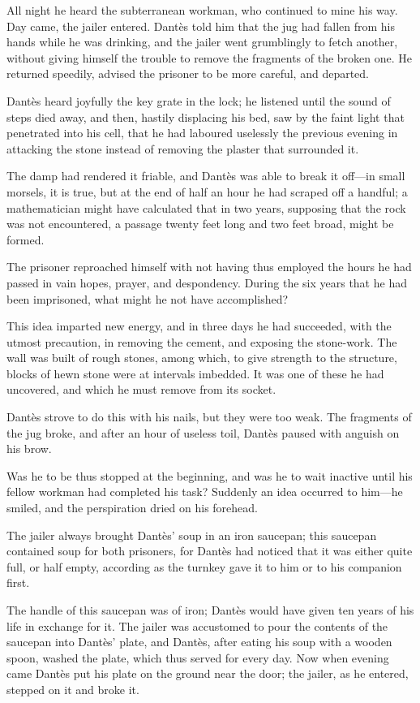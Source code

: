  All night he heard the subterranean workman, who continued to mine his way. Day came, the jailer entered. Dantès told him that the jug had fallen from his hands while he was drinking, and the jailer went grumblingly to fetch another, without giving himself the trouble to remove the fragments of the broken one. He returned speedily, advised the prisoner to be more careful, and departed. 

 Dantès heard joyfully the key grate in the lock; he listened until the sound of steps died away, and then, hastily displacing his bed, saw by the faint light that penetrated into his cell, that he had laboured uselessly the previous evening in attacking the stone instead of removing the plaster that surrounded it. 

 The damp had rendered it friable, and Dantès was able to break it off—in small morsels, it is true, but at the end of half an hour he had scraped off a handful; a mathematician might have calculated that in two years, supposing that the rock was not encountered, a passage twenty feet long and two feet broad, might be formed. 

 The prisoner reproached himself with not having thus employed the hours he had passed in vain hopes, prayer, and despondency. During the six years that he had been imprisoned, what might he not have accomplished? 

 This idea imparted new energy, and in three days he had succeeded, with the utmost precaution, in removing the cement, and exposing the stone-work. The wall was built of rough stones, among which, to give strength to the structure, blocks of hewn stone were at intervals imbedded. It was one of these he had uncovered, and which he must remove from its socket. 

 Dantès strove to do this with his nails, but they were too weak. The fragments of the jug broke, and after an hour of useless toil, Dantès paused with anguish on his brow. 

 Was he to be thus stopped at the beginning, and was he to wait inactive until his fellow workman had completed his task? Suddenly an idea occurred to him—he smiled, and the perspiration dried on his forehead. 

 The jailer always brought Dantès' soup in an iron saucepan; this saucepan contained soup for both prisoners, for Dantès had noticed that it was either quite full, or half empty, according as the turnkey gave it to him or to his companion first. 

 The handle of this saucepan was of iron; Dantès would have given ten years of his life in exchange for it.  The jailer was accustomed to pour the contents of the saucepan into Dantès' plate, and Dantès, after eating his soup with a wooden spoon, washed the plate, which thus served for every day. Now when evening came Dantès put his plate on the ground near the door; the jailer, as he entered, stepped on it and broke it. 

